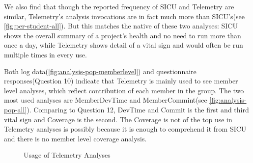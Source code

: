 \documentclass[11pt]{article}
\begin{document}
We also find that though the reported frequency of SICU and Telemetry are similar, Telemetry's analysis invocations are in fact much more than SICU's(see \autoref{fig:per-student-all}). But this matches the native of these two analyses: SICU shows the overall summary of a project's health and no need to run more than once a day, while Telemetry shows detail of a vital sign and would often be run multiple times in every use.

Both log data(\autoref{fig:analysis-pop-memberlevel}) and questionnaire responses(Question 10) indicate that Telemetry is mainly used to see member level analyses, which reflect contribution of each member in the group. The two most used analyses are MemberDevTime and MemberCommint(see \autoref{fig:analysis-pop-all}). Comparing to Question 12, DevTime and Commit is the first and third vital sign and Coverage is the second. The Coverage is not of the top use in Telemetry analyses is possibly because it is enough to comprehend it from SICU and there is no member level coverage analysis.

\begin{figure}[htbp] %
   \centering     
   \vspace{.3in}
   \caption{Usage of Telemetry Analyses}
   \label{fig:analysis-pop}
\end{figure}
\end{document}
